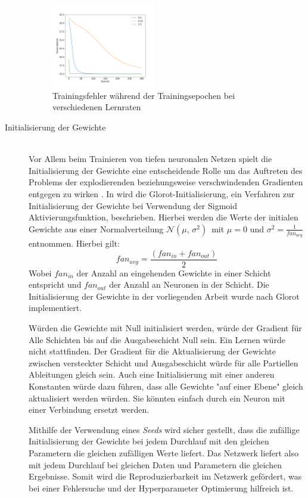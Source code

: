 \begin{description}
	\begin{figure}[ht]
		\centering
		\includegraphics[width = 0.45\textwidth]{Bilder/learning_rates.png}
		\caption{Trainingsfehler während der Trainingsepochen bei verschiedenen Lernraten}
		\label{fig:learning_rates}
	\end{figure}
	
	\item[Initialisierung der Gewichte]\hfill \\
	Vor Allem beim Trainieren von tiefen neuronalen Netzen spielt die Initialisierung der Gewichte eine entscheidende Rolle um das Auftreten des Problems der explodierenden beziehungsweise verschwindenden Gradienten entgegen zu wirken \cite{geron2017hands-on}. In \cite{Glorot10understandingthe} wird die Glorot-Initialisierung, ein Verfahren zur Initialisierung der Gewichte bei Verwendung der Sigmoid Aktivierungsfunktion, beschrieben. Hierbei werden die Werte der initialen Gewichte aus einer Normalverteilung $\mathcal{N}(\mu,\,\sigma^{2})\,$ mit $\mu = 0$ und $\sigma^{2}=\frac{1}{fan_{avg}}$ entnommen. Hierbei gilt: 
	\[
	fan_{avg}=\frac{(fan_{in}+fan_{out})}{2}
	\]
	Wobei $fan_{in}$ der Anzahl an eingehenden Gewichte in einer Schicht entspricht und  $fan_{out}$ der Anzahl an Neuronen in der Schicht. Die Initialisierung der Gewichte in der vorliegenden Arbeit wurde  nach Glorot implementiert.

	Würden die Gewichte mit Null initialisiert werden, würde der Gradient für Alle Schichten bis auf die Ausgabeschicht Null sein. Ein Lernen würde nicht stattfinden. Der Gradient für die Aktualisierung der Gewichte zwischen versteckter Schicht und Ausgabeschicht würde für alle Partiellen Ableitungen gleich sein. Auch eine Initialisierung mit einer anderen Konstanten würde dazu führen, dass alle Gewichte "auf einer Ebene" gleich aktualisiert werden würden. Sie könnten einfach durch ein Neuron mit einer Verbindung ersetzt werden.
	
	Mithilfe der Verwendung eines \emph{Seeds} wird sicher gestellt, dass die zufällige Initialisierung der Gewichte bei jedem Durchlauf mit den gleichen Parametern die gleichen zufälligen Werte liefert. Das Netzwerk liefert also mit jedem Durchlauf bei gleichen Daten und Parametern die gleichen Ergebnisse. Somit wird die Reproduzierbarkeit im Netzwerk gefördert, was bei einer Fehlersuche und der Hyperparameter Optimierung hilfreich ist.
	
\end{description}
